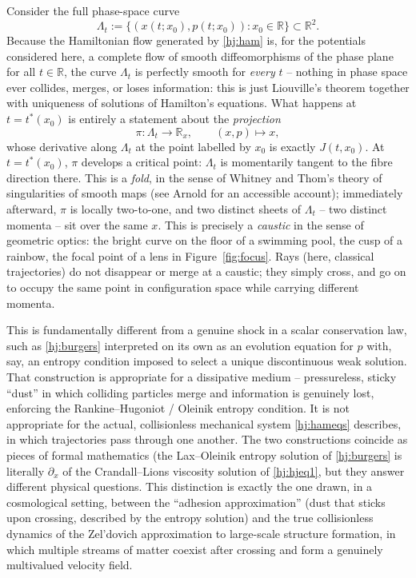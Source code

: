 Consider the full phase-space curve
\[
\Lambda_t := \big\{(x(t;x_0),p(t;x_0)) : x_0\in\mathbb{R}\big\} \subset \mathbb{R}^2.
\]
Because the Hamiltonian flow generated by \eqref{hj:ham} is, for the potentials
considered here, a complete flow of smooth diffeomorphisms of the phase plane
for all $t\in\mathbb{R}$, the curve $\Lambda_t$ is perfectly smooth for
\emph{every} $t$ -- nothing in phase space ever collides, merges, or loses
information: this is just Liouville's theorem together with uniqueness of
solutions of Hamilton's equations. What happens at $t=t^\ast(x_0)$ is entirely
a statement about the \emph{projection}
\[
\pi:\Lambda_t\to\mathbb{R}_x, \qquad (x,p)\mapsto x,
\]
whose derivative along $\Lambda_t$ at the point labelled by $x_0$ is exactly
$J(t,x_0)$. At $t=t^\ast(x_0)$, $\pi$ develops a critical point: $\Lambda_t$ is
momentarily tangent to the fibre direction there. This is a \emph{fold}, in the
sense of Whitney and Thom's theory of singularities of smooth maps (see Arnold
\cite{ArnoldCatastrophe} for an accessible account); immediately afterward,
$\pi$ is locally two-to-one, and two distinct sheets of $\Lambda_t$ -- two
distinct momenta -- sit over the same $x$. This is precisely a \emph{caustic}
in the sense of geometric optics: the bright curve on the floor of a swimming
pool, the cusp of a rainbow, the focal point of a lens in
Figure~\ref{fig:focus}. Rays (here, classical trajectories) do not disappear or
merge at a caustic; they simply cross, and go on to occupy the same point in
configuration space while carrying different momenta.

This is fundamentally different from a genuine shock in a scalar conservation
law, such as \eqref{hj:burgers} interpreted on its own as an evolution equation
for $p$ with, say, an entropy condition imposed to select a unique
discontinuous weak solution. That construction is appropriate for a dissipative
medium -- pressureless, sticky ``dust'' in which colliding particles merge and
information is genuinely lost, enforcing the Rankine--Hugoniot / Oleinik
entropy condition. It is not appropriate for the actual, collisionless
mechanical system \eqref{hj:hameqs} describes, in which trajectories pass
through one another. The two constructions coincide as pieces of formal
mathematics (the Lax--Oleinik entropy solution of \eqref{hj:burgers} is
literally $\partial_x$ of the Crandall--Lions viscosity solution of
\eqref{hj:hjeq1}, but they answer
different physical questions. This distinction is exactly the one drawn, in a
cosmological setting, between the ``adhesion approximation'' (dust that sticks
upon crossing, described by the entropy solution) and the true collisionless
dynamics of the Zel'dovich approximation to large-scale structure formation, in
which multiple streams of matter coexist after crossing and form a genuinely
multivalued velocity field.


